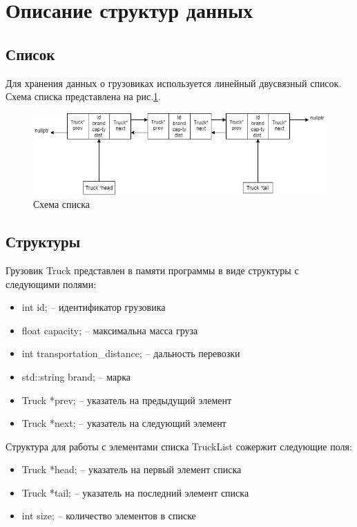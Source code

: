 \section*{Описание структур данных}

\subsection*{Список}

Для хранения данных о грузовиках используется линейный двусвязный список.
Схема списка представлена на рис.\ref{list_schema}.

\begin{figure}[htp!]
    \centering
    \includegraphics[width=0.9\linewidth]{photo/list_schema}
    \caption{Схема списка}
    \label{list_schema}
\end{figure}

\subsection*{Структуры}

Грузовик Truck представлен в памяти программы в виде структуры с следующими полями:

\begin{itemize}
    \item int id; -- идентификатор грузовика
    \item float capacity; -- максимальна масса груза
    \item int transportation\_distance; -- дальность перевозки
    \item std::string brand; -- марка
    \item Truck *prev; -- указатель на предыдущий элемент
    \item Truck *next; -- указатель  на следующий элемент
\end{itemize}

Структура для работы с элементами списка TruckList сожержит следующие поля:

\begin{itemize}
    \item Truck *head; -- указатель на первый элемент списка
    \item Truck *tail; -- указатель на последний элемент списка
    \item int size; -- количество элементов в списке
\end{itemize}

